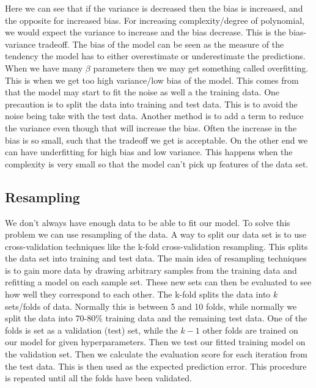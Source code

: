 \documentclass[12pt,a4paper,english]{article}
\begin{document}
Here we can see that if the variance is decreased then the bias is increased, and the opposite for increased bias. For increasing complexity/degree of polynomial, we would expect the variance to increase and the bias decrease. This is the bias-variance tradeoff. The bias of the model can be seen as the measure of the tendency the model has to either overestimate or underestimate the predictions. When we have many $\beta$ parameters then we may get something called overfitting. This is when we get too high variance/low bias of the model. This comes from that the model may start to fit the noise as well a the training data. One precaution is to split the data into training and test data. This is to avoid the noise being take with the test data. Another method is to add a term to reduce the variance even though that will increase the bias. Often the increase in the bias is so small, such that the tradeoff we get is acceptable. On the other end we can have underfitting for high bias and low variance. This happens when the complexity is very small so that the model can't pick up features of the data set.

\subsection{Resampling}
We don't always have enough data to be able to fit our model. To solve this problem we can use resampling of the data. A way to split our data set is to use cross-validation techniques like the k-fold cross-validation resampling. This splits the data set into training and test data. The main idea of resampling techniques is to gain more data by drawing arbitrary samples from the training data and refitting a model on each sample set. These new sets can then be evaluated to see how well they correspond to each other. The k-fold splits the data into $k$ sets/folds of data. Normally this is between 5 and 10 folds, while normally we split the data into 70-80\% training data and the remaining test data. One of the folds is set as a validation (test) set, while the $k-1$ other folds are trained on our model for given hyperparameters. Then we test our fitted training model on the validation set. Then we calculate the evaluation score for each iteration from the test data. This is then used as the expected prediction error. This procedure is repeated until all the folds have been validated.
\end{document}
